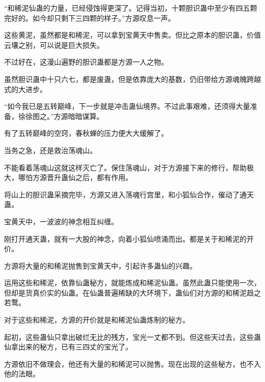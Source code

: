 \begin{this_body}
“和稀泥仙蛊的力量，已经侵蚀得更深了。记得当初，十颗胆识蛊中至少有四五颗完好的。如今却只剩下三四颗的样子。”方源叹息一声。

这些黄泥，虽然都是和稀泥，可以拿到宝黄天中售卖。但比之原本的胆识蛊，价值云壤之别，可以说是巨大损失。

不过好在，这漫山遍野的胆识蛊都是方源一人之物。

虽然胆识蛊中十只六七，都是废蛊，但是依靠庞大的基数，仍旧带给方源魂魄跨越式的大进步。

“如今我已是五转巅峰，下一步就是冲击蛊仙境界。不过此事艰难，还须得大量准备，徐徐图之。”方源暗暗谋算。

有了五转巅峰的空窍，春秋蝉的压力便大大缓解了。

当务之急，还是救治荡魂山。

不能看着荡魂山这就这样灭亡了。保住荡魂山，对于方源接下来的修行，帮助极大，哪怕方源晋升蛊仙之后，都有作用。

将山上的胆识蛊采摘完毕，方源又进入荡魂行宫里，和小狐仙合作，催动了通天蛊。

宝黄天中，一波波的神念相互纠缠。

刚打开通天蛊，就有一大股的神念，向着小狐仙喷涌而出。都是关于和稀泥的开价。

方源将大量的和稀泥抛售到宝黄天中，引起许多蛊仙的兴趣。

运用这些和稀泥，依靠仙蛊秘方，就能炼成和稀泥仙蛊。虽然此蛊只能使用一次，但却是货真价实的仙蛊。在仙蛊普遍稀缺的大环境下，蛊仙们对方源的和稀泥趋之若鹜。

对于这些和稀泥，方源的开价就是和稀泥仙蛊炼制的秘方。

起初，这些蛊仙只拿出破烂无比的残方，宝光一丈都不到。但这些天过去，这些蛊仙拿出来的秘方，已有三四丈的宝光了。

方源依旧不做理会，他还有大量的和稀泥可以抛售。现在出现的这些秘方，也不入他的法眼。

\end{this_body}

